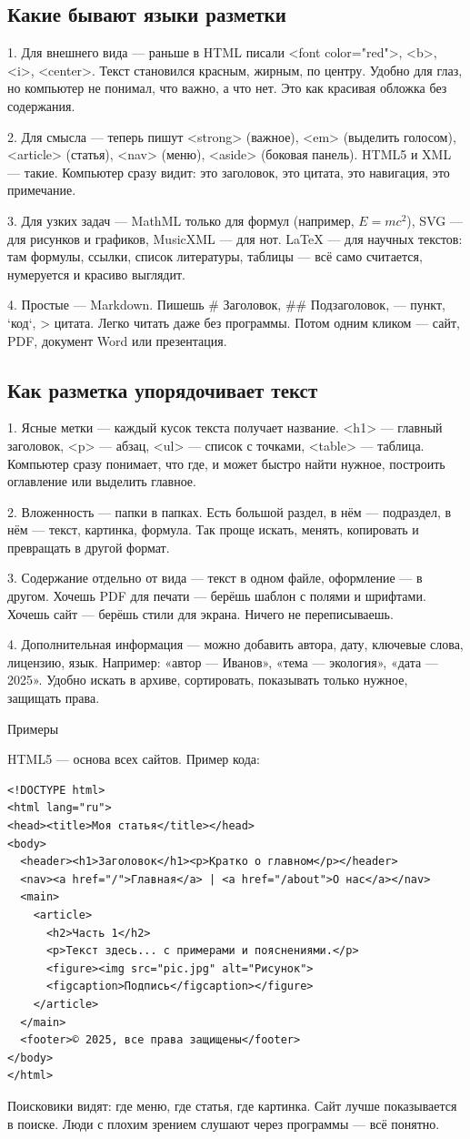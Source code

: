 \documentclass{ou}
\begin{document}
\subsection{Какие бывают языки разметки}
1.	Для внешнего вида — раньше в HTML писали <font color="red">, <b>, <i>, <center>. Текст становился красным, жирным, по центру. Удобно для глаз, но компьютер не понимал, что важно, а что нет. Это как красивая обложка без содержания.

2.	Для смысла — теперь пишут <strong> (важное), <em> (выделить голосом), <article> (статья), <nav> (меню), <aside> (боковая панель). HTML5 и XML — такие. Компьютер сразу видит: это заголовок, это цитата, это навигация, это примечание.

3. Для узких задач — MathML только для формул (например, $E=mc^2$), SVG — для рисунков и графиков, MusicXML — для нот. LaTeX — для научных текстов: там формулы, ссылки, список литературы, таблицы — всё само считается, нумеруется и красиво выглядит.

4. Простые — Markdown. Пишешь \# Заголовок, \#\# Подзаголовок, —  пункт, `код`, > цитата. Легко читать даже без программы. Потом одним кликом — сайт, PDF, документ Word или презентация.
\newpage
\subsection{Как разметка упорядочивает текст}
1.	Ясные метки — каждый кусок текста получает название. <h1> — главный заголовок, <p> — абзац, <ul> — список с точками, <table> — таблица. Компьютер сразу понимает, что где, и может быстро найти нужное, построить оглавление или выделить главное.

2.	Вложенность — папки в папках. Есть большой раздел, в нём — подраздел, в нём — текст, картинка, формула. Так проще искать, менять, копировать и превращать в другой формат.

3.	Содержание отдельно от вида — текст в одном файле, оформление — в другом. Хочешь PDF для печати — берёшь шаблон с полями и шрифтами. Хочешь сайт — берёшь стили для экрана. Ничего не переписываешь.

4.	Дополнительная информация — можно добавить автора, дату, ключевые слова, лицензию, язык. Например: «автор — Иванов», «тема — экология», «дата — 2025». Удобно искать в архиве, сортировать, показывать только нужное, защищать права.

Примеры

HTML5 — основа всех сайтов. Пример кода:
\begin{verbatim}
<!DOCTYPE html>
<html lang="ru">
<head><title>Моя статья</title></head>
<body>
  <header><h1>Заголовок</h1><p>Кратко о главном</p></header>
  <nav><a href="/">Главная</a> | <a href="/about">О нас</a></nav>
  <main>
    <article>
      <h2>Часть 1</h2>
      <p>Текст здесь... с примерами и пояснениями.</p>
      <figure><img src="pic.jpg" alt="Рисунок">
      <figcaption>Подпись</figcaption></figure>
    </article>
  </main>
  <footer>© 2025, все права защищены</footer>
</body>
</html>
\end{verbatim}
Поисковики видят: где меню, где статья, где картинка. Сайт лучше показывается в поиске. Люди с плохим зрением слушают через программы — всё понятно.
\end{document}

